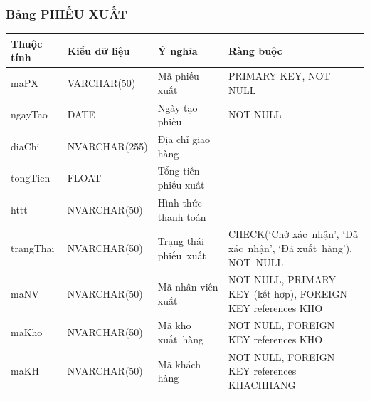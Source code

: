 \documentclass[a4paper,12pt]{report}
\begin{document}
\subsubsection{Bảng PHIẾU XUẤT}
\noindent
\begin{center}
    \begin{longtable}{|>{\centering\arraybackslash}p{3cm}|
        >{\centering\arraybackslash}p{4cm}|
        >{\centering\arraybackslash}p{4cm}|
        >{\centering\arraybackslash}p{4cm}|}
        \hline
        \textbf{Thuộc tính}                                                                                                               &
        \textbf{Kiểu dữ liệu}                                                                                                                             &
        \textbf{Ý nghĩa}                                                                                                 &
        \textbf{Ràng buộc}                                                                                                         \\
        \hline
        maPX &  VARCHAR(50)  & Mã phiếu xuất & PRIMARY KEY, NOT NULL \\
        \hline
        ngayTao & DATE  & Ngày tạo phiếu & NOT NULL \\                                                                                                                          
        \hline
        diaChi & NVARCHAR(255) & Địa chỉ giao hàng &  \\                                                                                                                          
        \hline
        tongTien & FLOAT & Tổng tiền phiếu xuất &  \\                                                                                                                          
        \hline
        httt & NVARCHAR(50) & Hình thức thanh toán & \\                                                                                                                          
        \hline
        trangThai &  NVARCHAR(50)  & Trạng thái phiếu~xuất & CHECK(‘Chờ xác~nhận’, ‘Đã xác~nhận’, ‘Đã xuất~hàng’), NOT~NULL \\
        \hline
        maNV & NVARCHAR(50) & Mã nhân viên xuất & NOT NULL, PRIMARY KEY (kết hợp), FOREIGN KEY references KHO \\                                                                                                                          
        \hline
        maKho & NVARCHAR(50) & Mã kho xuất~hàng & NOT NULL, FOREIGN KEY references KHO \\                                                                                                                          
        \hline
        maKH & NVARCHAR(50) & Mã khách hàng & NOT NULL, FOREIGN KEY references KHACHHANG \\                                                                                                                          
        \hline
    \end{longtable}
\end{center}
\end{document}
